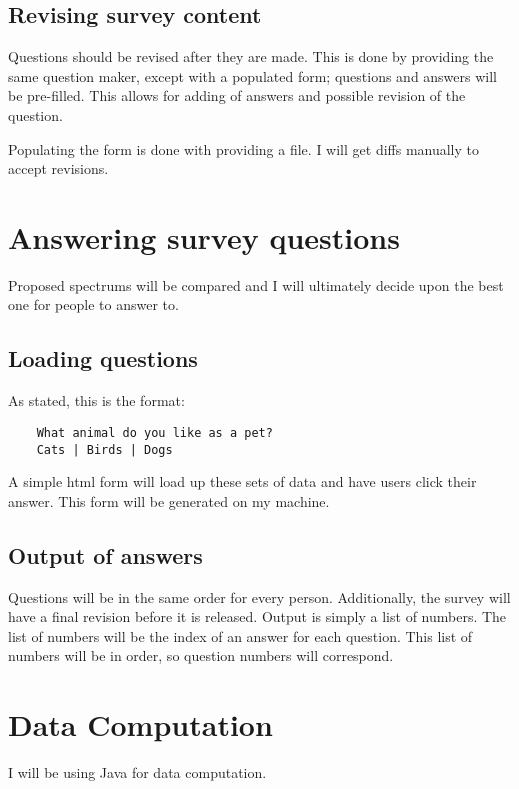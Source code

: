 \documentclass[12pt]{article}
\begin{document}
\subsection{Revising survey content}
Questions should be revised after they are made. This is done by providing the
same question maker, except with a populated form; questions and answers will be
pre-filled. This allows for adding of answers and possible revision of the
question.

Populating the form is done with providing a file. I will get diffs manually to
accept revisions.

\section{Answering survey questions}
Proposed spectrums will be compared and I will ultimately decide upon the best
one for people to answer to.

\subsection{Loading questions}
As stated, this is the format:
\begin{verbatim}
    What animal do you like as a pet?
    Cats | Birds | Dogs
\end{verbatim}

A simple html form will load up these sets of data and have users click their
answer. This form will be generated on my machine.

\subsection{Output of answers}
Questions will be in the same order for every person. Additionally, the survey
will have a final revision before it is released. Output is simply a list of
numbers. The list of numbers will be the index of an answer for each question.
This list of numbers will be in order, so question numbers will correspond.

\section{Data Computation}
I will be using Java for data computation.
\end{document}
